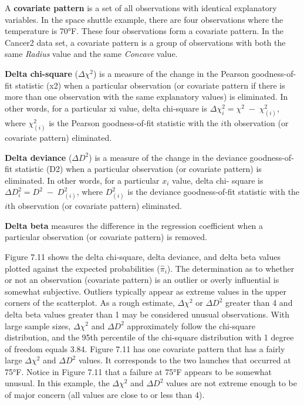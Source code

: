 \documentclass[
]{report}
\begin{document}
A \textbf{covariate pattern} is a set of all observations with identical explanatory variables. In the space shuttle example, there are four observations where the temperature is 70°F. These four observations form a covariate pattern. In the Cancer2 data set, a covariate pattern is a group of observations with both the same \emph{Radius} value and the same \emph{Concave} value.

\textbf{Delta chi-square} (\(\Delta \chi^2\)) is a measure of the change in the Pearson goodness-of-fit statistic (x2) when a
particular observation (or covariate pattern if there is more than one observation with the same explanatory
values) is eliminated. In other words, for a particular xi value, delta chi-square is \(\Delta \chi^2_i = \chi^2 \;-\;\chi^2_{(i)}\), where \(\chi^2_{(i)}\) is the Pearson goodness‐of‐fit statistic with the \(i\)th observation (or covariate pattern) eliminated.

\textbf{Delta deviance} (\(\Delta D^2\)) is a measure of the change in the deviance goodness-of-fit statistic (D2) when a
particular observation (or covariate pattern) is eliminated. In other words, for a particular \(x_i\) value, delta chi-
square is \(\Delta D^2_i = D^2 \;-\; D^2_{(i)}\), where \(D^2_{(i)}\) is the deviance goodness‐of‐fit statistic with the \(i\)th observation (or covariate pattern) eliminated.

\textbf{Delta beta} measures the difference in the regression coefficient when a particular observation (or covariate pattern) is removed.

Figure 7.11 shows the delta chi‐square, delta deviance, and delta beta values plotted against the expected probabilities (\(\hat\pi_i\)). The determination as to whether or not an observation (covariate pattern) is an outlier or overly influential is somewhat subjective. Outliers typically appear as extreme values in the upper corners of the scatterplot. As a rough estimate, \(\Delta\chi^2\) or \(\Delta D^2\) greater than 4 and delta beta values greater than 1 may be considered unusual observations. With large sample sizes, \(\Delta\chi^2\) and \(\Delta D^2\) approximately follow the chi‐square distribution, and the 95th percentile of the chi‐square distribution with 1 degree of freedom equals 3.84. Figure 7.11 has one covariate pattern that has a fairly large \(\Delta\chi^2\) and \(\Delta D^2\) values. It corresponds to the two launches that occurred at 75°F. Notice in Figure 7.11 that a failure at 75°F appears to be somewhat unusual. In this example, the \(\Delta\chi^2\) and \(\Delta D^2\) values are not extreme enough to be of major concern (all values are close to or less than 4).
\end{document}
